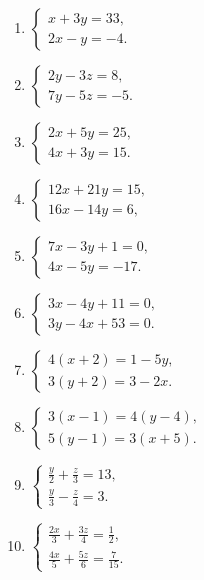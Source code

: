 \begin{enumerate}[start=3]
\item
  \(\left\{ \begin{array}{l} x + 3y = 33, \\ 2x - y = -4. \end{array} \right.\)
\item
  \(\left\{ \begin{array}{l} 2y - 3z = 8, \\ 7y - 5z = -5. \end{array} \right.\)
\item
  \(\left\{ \begin{array}{l} 2x + 5y = 25, \\ 4x + 3y = 15. \end{array} \right.\)
\item
  \(\left\{ \begin{array}{l} 12x + 21y = 15, \\ 16x - 14y = 6, \end{array} \right.\)
\item
  \(\left\{ \begin{array}{l} 7x - 3y + 1 = 0, \\ 4x - 5y = -17. \end{array} \right.\)
\item
  \(\left\{ \begin{array}{l} 3x - 4y + 11 = 0, \\ 3y - 4x + 53 = 0. \end{array} \right.\)
\item
  \(\left\{ \begin{array}{l} 4(x + 2) = 1 - 5y, \\ 3(y + 2) = 3 - 2x. \end{array} \right.\)
\item
  \(\left\{ \begin{array}{l} 3(x - 1) = 4(y - 4), \\ 5(y - 1) = 3(x + 5). \end{array} \right.\)
\item
  \(\left\{ \begin{array}{l} \frac{y}{2} + \frac{z}{3} = 13, \\ \frac{y}{3} - \frac{z}{4} = 3. \end{array} \right.\)
\item
  \(\left\{ \begin{array}{l} \frac{2x}{3} + \frac{3z}{4} = \frac{1}{2}, \\ \frac{4x}{5} + \frac{5z}{6} = \frac{7}{15}. \end{array} \right.\)

\end{enumerate}
